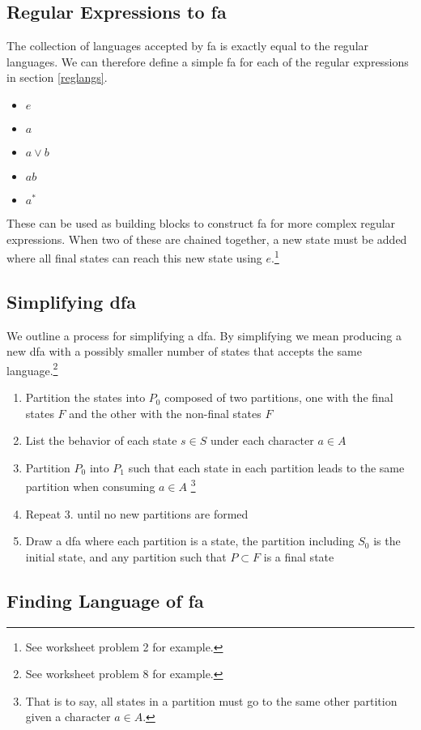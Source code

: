 \documentclass{article}
\begin{document}
		\subsection{Regular Expressions to fa}
			The collection of languages accepted by fa is exactly equal to the regular languages. We can therefore define a simple fa for each of the regular expressions in section \ref{reglangs}. \\
			\begin{itemize}
				\item $e$ \\
				\item $a$
				\item $a \lor b$
				\item $ab$
				\item $a^*$
			\end{itemize}
			These can be used as building blocks to construct fa for more complex regular expressions. When two of these are chained together, a new state must be added where all final states can reach this new state using $e$.\footnote{See worksheet problem 2 for example.}
		\subsection{Simplifying dfa}
		We outline a process for simplifying a dfa. By simplifying we mean producing a new dfa with a possibly smaller number of states that accepts the same language.\footnote{See worksheet problem 8 for example.}
		\begin{enumerate}
			\item Partition the states into $P_0$ composed of two partitions, one with the final states $F$ and the other with the non-final states $\overset{~}{F}$
			\item List the behavior of each state $s \in S$ under each character $a \in A$
			\item Partition $P_0$ into $P_1$ such that each state in each partition leads to the same partition when consuming $a \in A$ \footnote{That is to say, all states in a partition must go to the same other partition given a character $a \in A$.}
			\item Repeat 3. until no new partitions are formed
			\item Draw a dfa where each partition is a state, the partition including $S_0$ is the initial state, and any partition such that $P \subset F$ is a final state  
		\end{enumerate}
		\subsection{Finding Language of fa}
	
\end{document}
